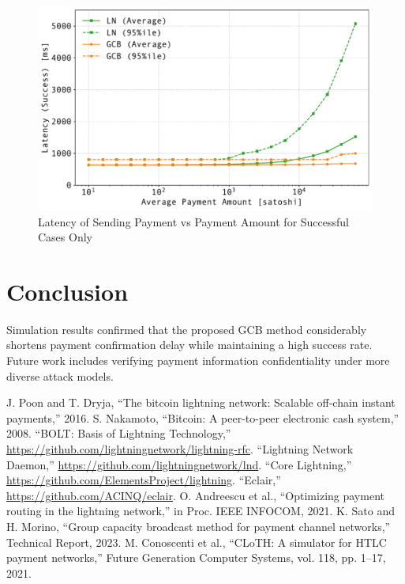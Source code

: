 \documentclass[conference]{IEEEtran}
\begin{document}
\begin{figure}[htbp]
	\centerline{\includegraphics[width=\linewidth]{fig/pmt_amt_vs_time}}
	\caption{Latency of Sending Payment vs Payment Amount for Successful Cases Only}
	\label{fig:pmt_amt_vs_time}
\end{figure}

\section{Conclusion}

Simulation results confirmed that the proposed GCB method considerably shortens payment confirmation delay while maintaining a high success rate. Future work includes verifying payment information confidentiality under more diverse attack models.

\begin{thebibliography}{00}
	 J. Poon and T. Dryja, ``The bitcoin lightning network: Scalable off-chain instant payments,'' 2016.
	 S. Nakamoto, ``Bitcoin: A peer-to-peer electronic cash system,'' 2008.
	 ``BOLT: Basis of Lightning Technology,'' \url{https://github.com/lightningnetwork/lightning-rfc}.
	 ``Lightning Network Daemon,'' \url{https://github.com/lightningnetwork/lnd}.
	 ``Core Lightning,'' \url{https://github.com/ElementsProject/lightning}.
	 ``Eclair,'' \url{https://github.com/ACINQ/eclair}.
	 O. Andreescu et al., ``Optimizing payment routing in the lightning network,'' in Proc. IEEE INFOCOM, 2021.
	 K. Sato and H. Morino, ``Group capacity broadcast method for payment channel networks,'' Technical Report, 2023.
	 M. Conoscenti et al., ``CLoTH: A simulator for HTLC payment networks,'' Future Generation Computer Systems, vol. 118, pp. 1--17, 2021.
\end{thebibliography}
\end{document}
